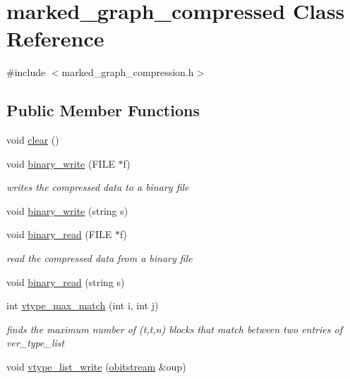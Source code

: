 \hypertarget{classmarked__graph__compressed}{}\section{marked\+\_\+graph\+\_\+compressed Class Reference}
\label{classmarked__graph__compressed}


{\ttfamily \#include $<$marked\+\_\+graph\+\_\+compression.\+h$>$}

\subsection*{Public Member Functions}
\begin{DoxyCompactItemize}
\item 
void \hyperlink{classmarked__graph__compressed_af58307bfadcaa4c3ca6dd594c2f9b3a9}{clear} ()
\item 
void \hyperlink{classmarked__graph__compressed_ab9cdb7fc43badd58fb5202f74ffac723}{binary\+\_\+write} (F\+I\+LE $\ast$f)
\begin{DoxyCompactList}\small\item\em writes the compressed data to a binary file \end{DoxyCompactList}\item 
void \hyperlink{classmarked__graph__compressed_a13ab09e4b399f179ec91746ae2b8b38c}{binary\+\_\+write} (string s)
\item 
void \hyperlink{classmarked__graph__compressed_a9db2d11bd63ad3d5a75e47b4023a89dd}{binary\+\_\+read} (F\+I\+LE $\ast$f)
\begin{DoxyCompactList}\small\item\em read the compressed data from a binary file \end{DoxyCompactList}\item 
void \hyperlink{classmarked__graph__compressed_a01c67fe4234738db6bb60459515c3ad8}{binary\+\_\+read} (string s)
\item 
int \hyperlink{classmarked__graph__compressed_a5ce51414e335d817f4be781fdcfbe9b1}{vtype\+\_\+max\+\_\+match} (int i, int j)
\begin{DoxyCompactList}\small\item\em finds the maximum number of (t,t\textquotesingle{},n) blocks that match between two entries of ver\+\_\+type\+\_\+list \end{DoxyCompactList}\item 
void \hyperlink{classmarked__graph__compressed_a889749dd51bc37917a156e337eac142a}{vtype\+\_\+list\+\_\+write} (\hyperlink{classobitstream}{obitstream} \&oup)

\end{DoxyCompactItemize}
